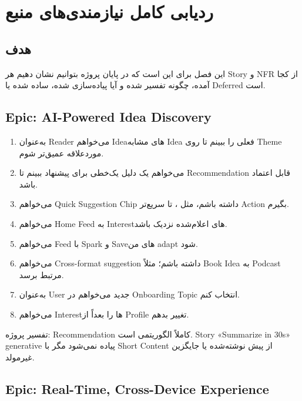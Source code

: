 
\chapter{ردیابی کامل نیازمندی‌های منبع}

\section{هدف}

این فصل برای این است که در پایان پروژه بتوانیم نشان دهیم هر Story و NFR از کجا آمده، چگونه تفسیر شده و آیا پیاده‌سازی شده، ساده شده یا Deferred است.

\section{Epic: AI-Powered Idea Discovery}

\begin{enumerate}
  \item به‌عنوان Reader می‌خواهم Ideaهای مشابه Idea فعلی را ببینم تا روی Theme موردعلاقه عمیق‌تر شوم. \eng{[NFR-17]}
  \item می‌خواهم یک دلیل یک‌خطی برای پیشنهاد ببینم تا Recommendation قابل اعتماد باشد. \eng{[NFR-17]}
  \item می‌خواهم Quick Suggestion Chip داشته باشم، مثل ، تا سریع‌تر Action بگیرم. \eng{[NFR-01]}
  \item می‌خواهم Home Feed به Interestهای اعلام‌شده نزدیک باشد. \eng{[NFR-01]}
  \item می‌خواهم Feed با Spark و Saveهای من adapt شود. \eng{[NFR-12]}
  \item می‌خواهم Cross-format suggestion داشته باشم؛ مثلاً Book Idea به Podcast مرتبط برسد. \eng{[NFR-03]}
  \item به‌عنوان User جدید می‌خواهم در Onboarding Topic انتخاب کنم. \eng{[NFR-01]}
  \item می‌خواهم Interestها را بعداً از Profile تغییر بدهم. \eng{[NFR-12]}
\end{enumerate}

\begin{decisionbox}
تفسیر پروژه: Recommendation کاملاً الگوریتمی است. Story «Summarize in 30s» generative پیاده نمی‌شود مگر با Short Content از پیش نوشته‌شده یا جایگزین غیرمولد.
\end{decisionbox}

\section{Epic: Real-Time, Cross-Device Experience}

